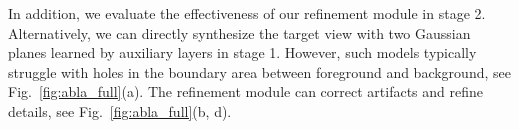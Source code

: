 In addition, we evaluate the effectiveness of our refinement module in stage 2. 
%
Alternatively, we can directly synthesize the target view with two Gaussian planes learned by auxiliary layers in stage 1.
%
However, such models typically struggle with holes in the boundary area between foreground and background, see Fig.~\ref{fig:abla_full}(a).
%
The refinement module can correct artifacts and refine details, see Fig.~\ref{fig:abla_full}(b, d).
